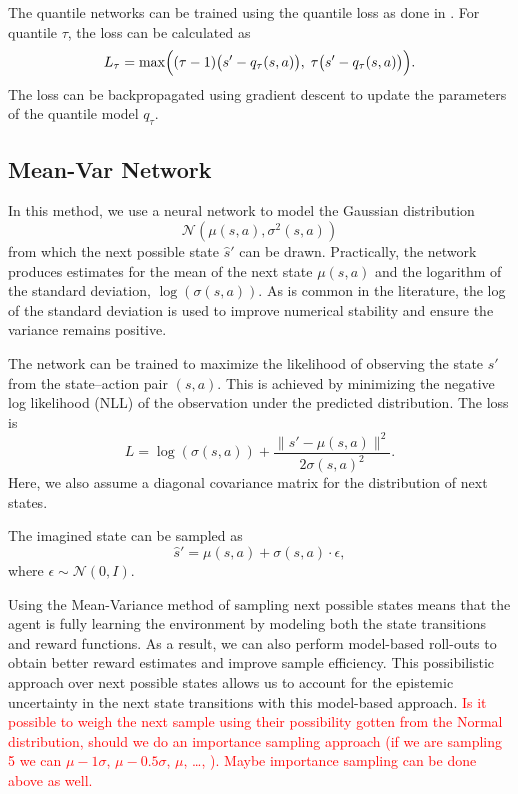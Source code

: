 \documentclass[12pt,a4paper]{report}
\newcommand\myworries[1]{\textcolor{red}{#1}}
\begin{document}
The quantile networks can be trained using the quantile loss as done in \cite{zhu2024maxmax}. For quantile \(\tau\), the loss can be calculated as 
\[
  L_\tau = \max\Bigl((\tau-1)\bigl(s' - q_\tau(s,a)\bigr),\; \tau\bigl(s' - q_\tau(s,a)\bigr)\Bigr).
\]
The loss can be backpropagated using gradient descent to update the parameters of the quantile model \(q_\tau\). 

\subsection{Mean-Var Network}

In this method, we use a neural network to model the Gaussian distribution \[\mathcal{N}(\mu(s,a), \sigma^2(s,a))\] from which the next possible state \(\hat{s}'\) can be drawn. Practically, the network produces estimates for the mean of the next state \(\mu(s,a)\) and the logarithm of the standard deviation, \(\log(\sigma(s,a))\). As is common in the literature, the log of the standard deviation is used to improve numerical stability and ensure the variance remains positive. \par

The network can be trained to maximize the likelihood of observing the state \(s'\) from the state--action pair \((s,a)\). This is achieved by minimizing the negative log likelihood (NLL) of the observation under the predicted distribution. The loss is 
\[
  L = \log(\sigma(s,a)) + \frac{\| s' - \mu(s,a)\|^2}{2\sigma(s,a)^2}.
\]
Here, we also assume a diagonal covariance matrix for the distribution of next states. \par

The imagined state can be sampled as 
\[
  \hat{s}' = \mu(s,a) + \sigma(s,a) \cdot \epsilon,
\]
where \(\epsilon \sim \mathcal{N}(0,I)\). \par

Using the Mean-Variance method of sampling next possible states means that the agent is fully learning the environment by modeling both the state transitions and reward functions. As a result, we can also perform model-based roll-outs to obtain better reward estimates and improve sample efficiency. This possibilistic approach over next possible states allows us to account for the epistemic uncertainty in the next state transitions with this model-based approach. \myworries{Is it possible to weigh the next sample using their possibility gotten from the Normal distribution, should we do an importance sampling approach (if we are sampling 5 we can \(\mu - 1 \sigma\), \(\mu - 0.5 \sigma\), \(\mu\), \dots,  ). Maybe importance sampling can be done above as well.}
\end{document}
